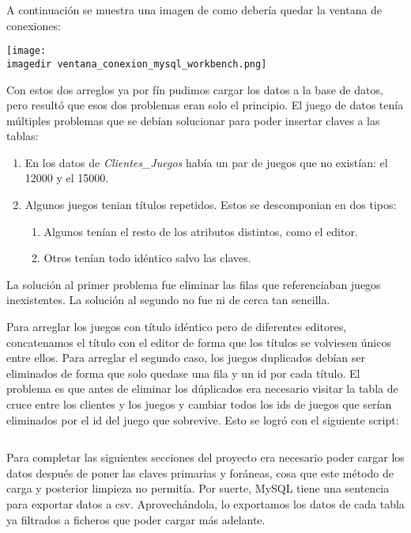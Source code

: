 \documentclass[a4paper, 11pt, oneside]{article} %
\newcommand{\scriptdir}{../scripts/} %
\newcommand{\imagedir}{../images/} %
\begin{document}
A continuación se muestra una imagen de como debería quedar la ventana de conexiones:

\texttt{[image: \\imagedir ventana\_conexion\_mysql\_workbench.png]}

Con estos dos arreglos ya por fín pudimos cargar los datos a la base de datos, pero resultó que esos dos problemas eran solo el principio. El juego de datos tenía múltiples problemas que se debían solucionar para poder insertar claves a las tablas:

\begin{enumerate}
	\item En los datos de \emph{Clientes\_Juegos} había un par de juegos que no existían: el 12000 y el 15000.

	\item Algunos juegos tenian títulos repetidos. Estos se descomponian en dos tipos:
	\begin{enumerate}
		\item Algunos tenían el resto de los atributos distintos, como el editor.
		\item Otros tenían todo idéntico salvo las claves.
	\end{enumerate}
\end{enumerate}

La solución al primer problema fue eliminar las filas que referenciaban juegos inexistentes. La solución al segundo no fue ni de cerca tan sencilla.

Para arreglar los juegos con título idéntico pero de diferentes editores, concatenamos el título con el editor de forma que los títulos se volviesen únicos entre ellos. Para arreglar el segundo caso, los juegos duplicados debían ser eliminados de forma que solo quedase una fila y un id por cada título. El problema es que antes de eliminar los dúplicados era necesario visitar la tabla de cruce entre los clientes y los juegos y cambiar todos los ids de juegos que serían eliminados por el id del juego que sobrevive. Esto se logró con el siguiente script:

\inputminted{mysql}{\scriptdir limpieza_datos.sql}

Para completar las siguientes secciones del proyecto era necesario poder cargar los datos después de poner las claves primarias y foráneas, cosa que este método de carga y posterior limpieza no permitía. Por suerte, MySQL tiene una sentencia para exportar datos a csv. Aprovechándola, lo exportamos los datos de cada tabla ya filtrados a ficheros que poder cargar más adelante.
\end{document}
